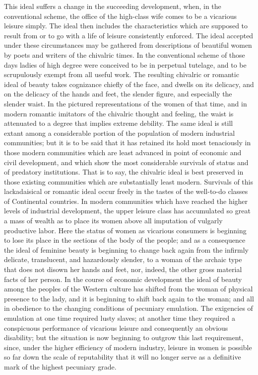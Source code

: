 \documentclass[12pt]{report}
\begin{document}
This ideal suffers a change in the succeeding development, when, in the
conventional scheme, the office of the high-class wife comes to be a
vicarious leisure simply. The ideal then includes the characteristics
which are supposed to result from or to go with a life of leisure
consistently enforced. The ideal accepted under these circumstances may
be gathered from descriptions of beautiful women by poets and writers of
the chivalric times. In the conventional scheme of those days ladies
of high degree were conceived to be in perpetual tutelage, and to be
scrupulously exempt from all useful work. The resulting chivalric or
romantic ideal of beauty takes cognizance chiefly of the face, and
dwells on its delicacy, and on the delicacy of the hands and feet,
the slender figure, and especially the slender waist. In the pictured
representations of the women of that time, and in modern romantic
imitators of the chivalric thought and feeling, the waist is attenuated
to a degree that implies extreme debility. The same ideal is still
extant among a considerable portion of the population of modern
industrial communities; but it is to be said that it has retained
its hold most tenaciously in those modern communities which are least
advanced in point of economic and civil development, and which show the
most considerable survivals of status and of predatory institutions.
That is to say, the chivalric ideal is best preserved in those existing
communities which are substantially least modern. Survivals of this
lackadaisical or romantic ideal occur freely in the tastes of the
well-to-do classes of Continental countries. In modern communities which
have reached the higher levels of industrial development, the upper
leisure class has accumulated so great a mass of wealth as to place its
women above all imputation of vulgarly productive labor. Here the status
of women as vicarious consumers is beginning to lose its place in the
sections of the body of the people; and as a consequence the ideal of
feminine beauty is beginning to change back again from the infirmly
delicate, translucent, and hazardously slender, to a woman of the
archaic type that does not disown her hands and feet, nor, indeed, the
other gross material facts of her person. In the course of economic
development the ideal of beauty among the peoples of the Western culture
has shifted from the woman of physical presence to the lady, and it is
beginning to shift back again to the woman; and all in obedience to the
changing conditions of pecuniary emulation. The exigencies of emulation
at one time required lusty slaves; at another time they required a
conspicuous performance of vicarious leisure and consequently an obvious
disability; but the situation is now beginning to outgrow this last
requirement, since, under the higher efficiency of modern industry,
leisure in women is possible so far down the scale of reputability that
it will no longer serve as a definitive mark of the highest pecuniary
grade.
\end{document}
